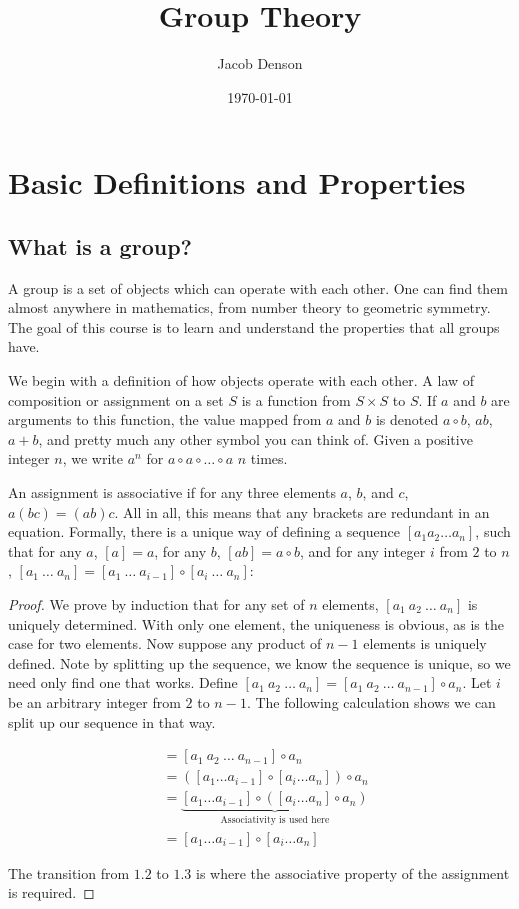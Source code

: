 \documentclass{report}
\title{Group Theory}
\author{Jacob Denson}
\date{\today}
\begin{document}
\maketitle

\chapter{Basic Definitions and Properties}

\section{What is a group?}

A group is a set of objects which can operate with each other. One can find them almost anywhere in mathematics, from number theory to geometric symmetry. The goal of this course is to learn and understand the properties that all groups have.

We begin with a definition of how objects operate with each other. A law of composition or assignment on a set $S$ is a function from $S \times S$ to $S$. If $a$ and $b$ are arguments to this function, the value mapped from $a$ and $b$ is denoted $a \circ b$, $ab$, $a + b$, and pretty much any other symbol you can think of. Given a positive integer $n$, we write $a^n$ for $a \circ a \circ \dots \circ a$ $n$ times.

An assignment is associative if for any three elements $a$, $b$, and $c$, $a(bc) = (ab)c$. All in all, this means that any brackets are redundant in an equation. Formally, there is a unique way of defining a sequence $[a_1 a_2 \dots a_n]$, such that for any $a$, $[a] = a$, for any $b$, $[ab] = a \circ b$, and for any integer $i$ from $2$ to $n$, $[a_1\ \dots\ a_n] = [a_1\ \dots\ a_{i-1}] \circ [a_i\ \dots\ a_n]$:
\begin{proof}
    We prove by induction that for any set of $n$ elements, $[a_1\ a_2\ \dots\ a_n]$ is uniquely determined. With only one element, the uniqueness is obvious, as is the case for two elements. Now suppose any product of $n-1$ elements is uniquely defined. Note by splitting up the sequence, we know the sequence is unique, so we need only find one that works. Define $[a_1\ a_2\ \dots\ a_n] = [a_1\ a_2\ \dots\ a_{n-1}] \circ a_n$. Let $i$ be an arbitrary integer from $2$ to $n-1$. The following calculation shows we can split up our sequence in that way.

    \begin{align*}
    [a_1\ a_2\ \dots\ a_n] &= [a_1\ a_2\ \dots\ a_{n-1}] \circ a_n\\
    &= ([a_1 \dots a_{i-1}] \circ [a_i \dots a_n]) \circ a_n\\
    &= \underbrace{[a_1 \dots a_{i-1}] \circ ([a_i \dots a_n] \circ a_n)}_\text{Associativity is used here}\\
    &= [a_1 \dots a_{i-1}] \circ [a_i \dots a_n]
    \end{align*}

    The transition from $1.2$ to $1.3$ is where the associative property of the assignment is required.
\end{proof}
\end{document}
